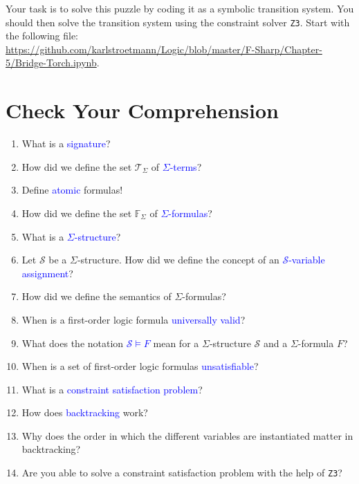 \noindent
Your task is to solve this puzzle by coding it as a symbolic transition system.  You should then solve the
transition system using the constraint solver \texttt{Z3}.
Start with the following file:
\\[0.2cm]
\hspace*{0.0cm}
\href{https://github.com/karlstroetmann/Logic/blob/master/F-Sharp/Chapter-5/Bridge-Torch.ipynb}{https://github.com/karlstroetmann/Logic/blob/master/F-Sharp/Chapter-5/Bridge-Torch.ipynb}.
\eox


\section{Check Your Comprehension}
\begin{enumerate}
\item What is a \textcolor{blue}{signature}?
\item How did we define the set $\mathcal{T}_\Sigma$ of \textcolor{blue}{$\Sigma$-terms}?
\item Define \textcolor{blue}{atomic} formulas!
\item How did we define the set $\mathbb{F}_\Sigma$ of \textcolor{blue}{$\Sigma$-formulas}?
\item What is a \textcolor{blue}{$\Sigma$-structure}?
\item Let $\mathcal{S}$ be a $\Sigma$-structure. How did we define the concept of
      an \textcolor{blue}{$\mathcal{S}$-variable assignment}?
\item How did we define the semantics of $\Sigma$-formulas?
\item When is a first-order logic formula \textcolor{blue}{universally valid}?
\item What does the notation \textcolor{blue}{$\mathcal{S} \models F$} mean for a $\Sigma$-structure $\mathcal{S}$ and a
      $\Sigma$-formula $F$?
\item When is a set of first-order logic formulas \textcolor{blue}{unsatisfiable}?
\item What is a \textcolor{blue}{constraint satisfaction problem}?
\item How does \textcolor{blue}{backtracking} work?
\item Why does the order in which the different variables are instantiated matter in backtracking?
\item Are you able to solve a constraint satisfaction problem with the help of \texttt{Z3}?
\end{enumerate}

